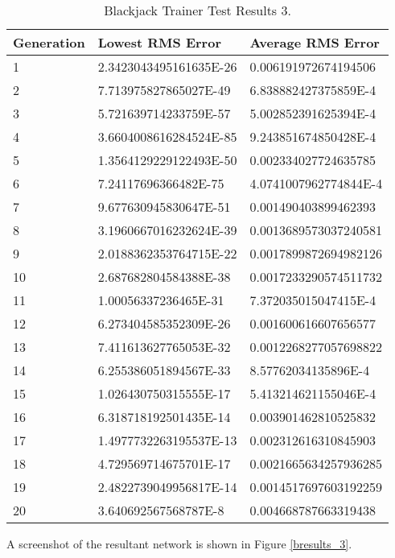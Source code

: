 \begin{center}
    \begin{longtable}{ | l | l | l |}
      \caption{Blackjack Trainer Test Results 3.} \label{btr3} \\
   \hline
  Generation & Lowest RMS Error & Average RMS Error \\ \hline
1 &	2.3423043495161635E-26 &	0.006191972674194506 \\ \hline
2 &	7.713975827865027E-49 &	6.838882427375859E-4 \\ \hline
3 &	5.721639714233759E-57 &	5.002852391625394E-4 \\ \hline
4 &	3.6604008616284524E-85 &	9.243851674850428E-4 \\ \hline
5 &	1.3564129229122493E-50 &	0.002334027724635785 \\ \hline
6 &	7.24117696366482E-75 &	4.0741007962774844E-4 \\ \hline
7 &	9.677630945830647E-51 &	0.001490403899462393 \\ \hline
8 &	3.1960667016232624E-39 &	0.0013689573037240581 \\ \hline
9 &	2.0188362353764715E-22 &	0.0017899872694982126 \\ \hline
10 &	2.687682804584388E-38 &	0.0017233290574511732 \\ \hline
11 &	1.00056337236465E-31 &	7.372035015047415E-4 \\ \hline
12 &	6.273404585352309E-26 &	0.001600616607656577 \\ \hline
13 &	7.411613627765053E-32 &	0.0012268277057698822 \\ \hline
14 &	6.255386051894567E-33 &	8.57762034135896E-4 \\ \hline
15 &	1.026430750315555E-17 &	5.413214621155046E-4 \\ \hline
16 &	6.318718192501435E-14 &	0.003901462810525832 \\ \hline
17 &	1.4977732263195537E-13 &	0.002312616310845903 \\ \hline
18 &	4.729569714675701E-17 &	0.0021665634257936285 \\ \hline
19 &	2.4822739049956817E-14 &	0.0014517697603192259 \\ \hline
20 &	3.640692567568787E-8	& 0.004668787663319438 \\ \hline
\end{longtable}
\end{center}

A screenshot of the resultant network is shown in Figure \ref{bresults_3}.

